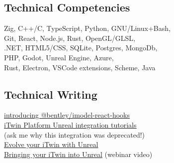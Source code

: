 \documentclass[Letterpaper,11pt]{article}
\newcommand\link[2]{\href{#1}{\underline{#2}}}
\begin{document}
\begin{multicols}{2}

    \subsection*{Technical Competencies}
        Zig, C++/C, TypeScript, Python, GNU/Linux+Bash,
        \\
        Git, React, Node.js, Rust, OpenGL/GLSL,
        \\
        .NET, HTML5/CSS, SQLite, Postgres, MongoDb,
        \\ 
        PHP, Godot, Unreal Engine, Azure,
        \\
        Rust, Electron, VSCode extensions, Scheme, Java

    \subsection*{Technical Writing}
        \link{https://medium.com/itwinjs/introducing-bentley-imodel-react-hooks-8945a72711d2}{introducing @bentley/imodel-react-hooks}
        \\
        \link{https://web.archive.org/web/20220926063257/https://developer.bentley.com/tutorials/itwin-unreal-controlling-your-imodel/}{iTwin Platform Unreal integration tutorials}
        \\
        (ask me why this integration was deprecated!)
        \\
        \link{https://medium.com/itwinjs/evolve-your-itwin-with-unreal-45206afe19f4}{Evolve your iTwin with Unreal}
        \\
    \link{https://www.youtube.com/watch?v=IV0eBECws1k&t=130s}{Bringing your iTwin into Unreal} (webinar video)

\end{multicols}

\clearpage
\end{document}
